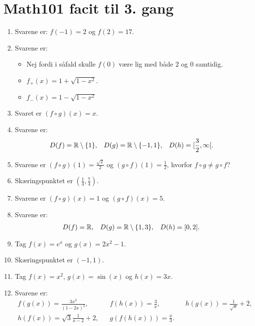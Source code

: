 \newpage
\section{Math101 facit til 3. gang}
\begin{enumerate}
	
	\item Svarene er: $f(-1)=2$ og $f(2)=17$.
	
	\item Svarene er:
	\begin{itemize}
		\item Nej fordi i såfald skulle $f(0)$ være lig med både $2$ og $0$ samtidig.
		\item $f_+(x) = 1+\sqrt{1-x^2}$.
		\item $f_-(x) = 1-\sqrt{1-x^2}$
	\end{itemize}	
	
	\item Svaret er $(f\circ g)(x)=x$.
	

	\item Svarene er:
	\begin{align*}
	D(f)=\mathbb{R}\setminus\{1\},&& D(g)=\mathbb{R}\setminus \{-1,1\},&& D(h)=[\frac{3}{2},\infty[.
	\end{align*}	
	
	\item  Svarene er $(f\circ g)(1)=\frac{\sqrt{2}}{2}$ og $(g\circ f)(1)=\frac{1}{2}$, hvorfor $f\circ g\neq g\circ f$?
	
	\item Skæringspunktet er $(\frac{1}{4},\frac{7}{4})$.	
	
		\item Svarene er $(f\circ g)(x)=1$ og $(g\circ f)(x)=5$.
	
		\item Svarene er:
	\begin{align*}
	D(f)=\mathbb{R},&& D(g)=\mathbb{R}\setminus\{1,3\},&& D(h)=[0,2].
	\end{align*}
	
	
	

	\item Tag $f(x)=e^x$ og $g(x)=2x^2-1$.
	
	\item Skæringspunktet er $(-1,1)$.
	
	\item Tag $f(x)=x^2$, $g(x)=\sin(x)$ og $h(x)=3x$.
	
	\item Svarene er:
	\begin{align*}
	f(g(x))=\frac{3x^2}{(1-2x)^2},&& f(h(x))=\frac{3}{x},&& h(g(x))=\frac{1}{\sqrt{x}}+2,\\ h(f(x))=\sqrt{3}\frac{1}{x-2}+2,&&g(f(h(x)))=\frac{x}{3}.
	\end{align*} 
	

\end{enumerate}

